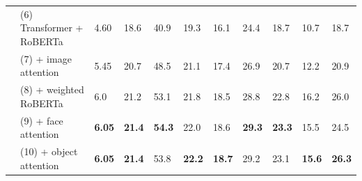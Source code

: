 \begin{table}[t]
\begin{tabularx}{\textwidth}{llXXX XX XX XX}
		 & (6) Transformer + RoBERTa                         & 4.60          & 18.6          & 40.9          & 19.3          & 16.1          & 24.4          & 18.7          & 10.7          & 18.7          \\
		 & (7) \quad + image attention                       & 5.45          & 20.7          & 48.5          & 21.1          & 17.4          & 26.9          & 20.7          & 12.2          & 20.9          \\
		 & (8) \quad\quad + weighted RoBERTa                 & 6.0           & 21.2          & 53.1          & 21.8          & 18.5          & 28.8          & 22.8          & 16.2          & 26.0          \\
		 & (9) \quad\quad\quad + face attention              & \textbf{6.05} & \textbf{21.4} & \textbf{54.3} & 22.0          & 18.6          & \textbf{29.3} & \textbf{23.3} & 15.5          & 24.5          \\
		 & (10) \quad\quad\quad\quad + object attention      & \textbf{6.05} & \textbf{21.4} & 53.8          & \textbf{22.2} & \textbf{18.7} & 29.2          & 23.1          & \textbf{15.6} & \textbf{26.3} \\



\end{tabularx}
\end{table}
